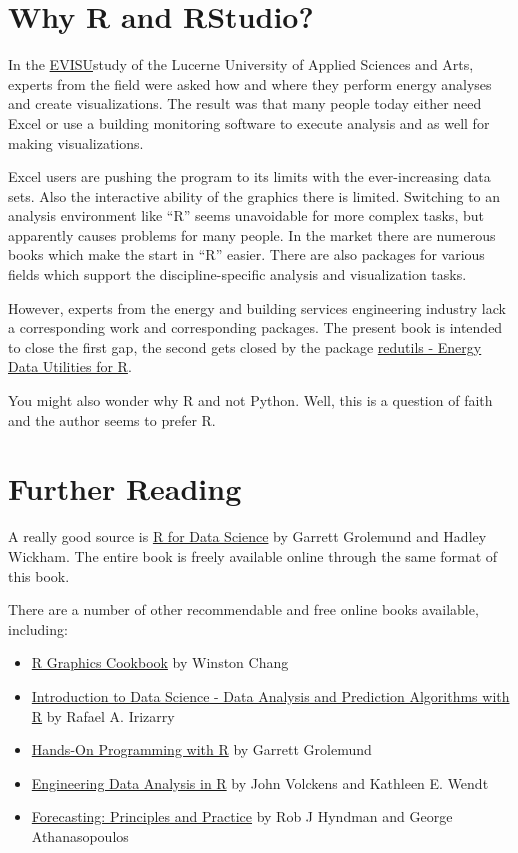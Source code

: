 \documentclass[
  a4paperpaper,
]{book}
\providecommand{\tightlist}{%
  \setlength{\itemsep}{0pt}\setlength{\parskip}{0pt}}
\begin{document}
\hypertarget{why-r-and-rstudio}{%
\section{Why R and RStudio?}\label{why-r-and-rstudio}}

In the \href{https://github.com/hslu-ige-laes/evisu}{EVISU}study of the Lucerne University of Applied Sciences and Arts, experts from the field were asked how and where they perform energy analyses and create visualizations. The result was that many people today either need Excel or use a building monitoring software to execute analysis and as well for making visualizations.

Excel users are pushing the program to its limits with the ever-increasing data sets. Also the interactive ability of the graphics there is limited. Switching to an analysis environment like ``R'' seems unavoidable for more complex tasks, but apparently causes problems for many people. In the market there are numerous books which make the start in ``R'' easier. There are also packages for various fields which support the discipline-specific analysis and visualization tasks.

However, experts from the energy and building services engineering industry lack a corresponding work and corresponding packages. The present book is intended to close the first gap, the second gets closed by the package \href{https://github.com/hslu-ige-laes/redutils}{redutils - Energy Data Utilities for R}.

You might also wonder why R and not Python. Well, this is a question of faith and the author seems to prefer R.

\hypertarget{further-reading}{%
\section{Further Reading}\label{further-reading}}

A really good source is \href{http://r4ds.had.co.nz}{R for Data Science} by Garrett Grolemund and Hadley Wickham. The entire book is freely available online through the same format of this book.

There are a number of other recommendable and free online books available, including:

\begin{itemize}
\tightlist
\item
  \href{https://r-graphics.org/}{R Graphics Cookbook} by Winston Chang
\item
  \href{https://rafalab.github.io/dsbook/}{Introduction to Data Science - Data Analysis and Prediction Algorithms with R} by Rafael A. Irizarry
\item
  \href{https://rstudio-education.github.io/hopr/}{Hands-On Programming with R} by Garrett Grolemund
\item
  \href{https://smogdr.github.io/edar_coursebook/}{Engineering Data Analysis in R} by John Volckens and Kathleen E. Wendt
\item
  \href{https://otexts.com/fpp2/}{Forecasting: Principles and Practice} by Rob J Hyndman and George Athanasopoulos
\end{itemize}
\end{document}
